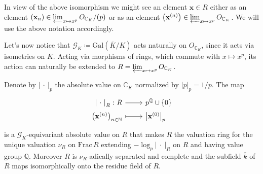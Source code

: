 \begin{ntt}[]\label{not:tiltingElts}
	In view of the above isomorphism we might see an element $\mathbf{x} \in R$
	either as an element 
	$\left( \mathbf{x}_n \right) \in \varprojlim_{x \mapsto x^p} O_{\mathbb{C}_K}/ (p)$
	or as an element
	$\left( \mathbf{x}^{(n)} \right) \in \varprojlim_{x \mapsto x^p} O_{\mathbb{C}_K}$.
	We will use the above notation accordingly.
\end{ntt}


\begin{rem}[]\label{rem:GKActionR}
	Let's now notice that $\mathscr{G}_K \coloneqq \mathrm{Gal}\left( \overline{K} / K \right)$
	acts naturally on $O_{\mathbb{C}_K}$, since it acts via isometries on
	$\overline{K}$.
	Acting via morphisms of rings, which commute with $x \mapsto x^p$,
	its action can naturally be extended to
	$R = \varprojlim_{x \mapsto x^p} O_{\mathbb{C}_K}$.
\end{rem}


\begin{lem}
	Denote by $\left| \ \cdot \ \right|_p$ the absolute value on $\mathbb{C}_K$
	normalized by $\left| p \right|_p = 1/p$.
	The map
	\begin{equation*}
	\begin{tikzcd}[row sep = 0ex
		,/tikz/column 1/.append style={anchor=base east}
		,/tikz/column 2/.append style={anchor=base west}]
		\left| \ \cdot \ \right|_R\colon R \arrow[r, "", rightarrow] &
		p^{\mathbb{Q}} \cup \left\{ 0 \right\} \\
		\left( \mathbf{x}^{(n)} \right)_{n \in \mathbb{N}} \arrow[r, "", mapsto] & 
		\left| \mathbf{x}^{(0)} \right|_p
	\end{tikzcd}
	\end{equation*} 
	is a $\mathscr{G}_K$-equivariant absolute value on $R$ that makes
	$R$ the valuation ring for the unique valuation
	$\nu_R$ on $\mathrm{Frac}\, R$ extending
	$-\log_p \left| \ \cdot \ \right|_R$ on $R$
	and having value group $\mathbb{Q}$.
	Moreover $R$ is $\nu_R$-adically separated and complete
	and the subfield $\overline{k}$ of $R$ maps
	isomorphically onto the residue field of $R$.
\end{lem} 


